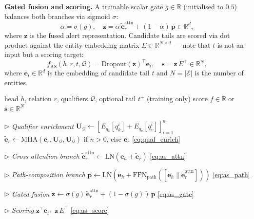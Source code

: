 \documentclass[10pt,journal,compsoc]{IEEEtran}
\begin{document}
\noindent\textbf{Gated fusion and scoring.}
A trainable scalar gate $g \in \mathbb{R}$
(initialised to $0.5$) balances both branches
via sigmoid $\sigma$:
\begin{equation}
  \alpha = \sigma(g), \quad
  \mathbf{z} = \alpha\,
  \tilde{\mathbf{e}}_r^{\mathrm{attn}}
  + (1{-}\alpha)\,\mathbf{p}
  \in \mathbb{R}^d,
  \label{eq:as_gate}
\end{equation}
where $\mathbf{z}$ is the fused alert representation.
Candidate tails are scored via dot product against
the entity embedding matrix
$E \in \mathbb{R}^{N \times d}$ ---
note that $t$ is not an input but a scoring target:
\begin{equation}
  f_{\mathrm{AS}}(h,r,t,\mathcal{Q})
  = \mathrm{Dropout}(\mathbf{z})^{\top}
  \mathbf{e}_t, \quad
  \mathbf{s} = \mathbf{z}\,E^{\top}
  \in \mathbb{R}^N,
  \label{eq:as_score}
\end{equation}
where $\mathbf{e}_t \in \mathbb{R}^d$ is the
embedding of candidate tail $t$ and
$N = |\mathcal{E}|$ is the number of entities.

\begin{algorithm}[t]
\caption{AlertStar: Forward Pass}
\label{alg:alertstar}
\begin{algorithmic}[1]
\Require head $h$, relation $r$,
  qualifiers $\mathcal{Q}$,
  optional tail $t^+$ (training only)
\Ensure score $f \in \mathbb{R}$ or
  $\mathbf{s} \in \mathbb{R}^N$

\Statex \hfill $\triangleright$
  \textit{Qualifier enrichment}
\State $\mathbf{U}_\mathcal{Q} \leftarrow
  [E_{q_k}[q_k^i] + E_{q_v}[q_v^i]]_{i=1}^n$
\State $\tilde{\mathbf{e}}_r \leftarrow
  \mathrm{MHA}(\mathbf{e}_r,
  \mathbf{U}_\mathcal{Q},
  \mathbf{U}_\mathcal{Q})$
  if $n>0$, else $\mathbf{e}_r$
  \hfill \eqref{eq:qual_enrich}

\Statex \hfill $\triangleright$
  \textit{Cross-attention branch}
\State $\tilde{\mathbf{e}}_r^{\mathrm{attn}}
  \leftarrow \mathrm{LN}(
  \mathbf{e}_h + \tilde{\mathbf{e}}_r)$
  \hfill \eqref{eq:as_attn}

\Statex \hfill $\triangleright$
  \textit{Path-composition branch}
\State $\mathbf{p} \leftarrow \mathrm{LN}(
  \mathbf{e}_h + \mathrm{FFN}_{\mathrm{path}}(
  [\mathbf{e}_h \|
  \tilde{\mathbf{e}}_r^{\mathrm{attn}}]))$
  \hfill \eqref{eq:as_path}

\Statex \hfill $\triangleright$
  \textit{Gated fusion}
\State $\mathbf{z} \leftarrow
  \sigma(g)\,\tilde{\mathbf{e}}_r^{\mathrm{attn}}
  + (1{-}\sigma(g))\,\mathbf{p}$
  \hfill \eqref{eq:as_gate}

\Statex \hfill $\triangleright$
  \textit{Scoring}
  \State \Return $\mathbf{z}^\top \mathbf{e}_{t^+}$
\Else
  \State \Return $\mathbf{z}\,E^\top$
\EndIf
\hfill \eqref{eq:as_score}
\end{algorithmic}
\end{algorithm}
\end{document}
